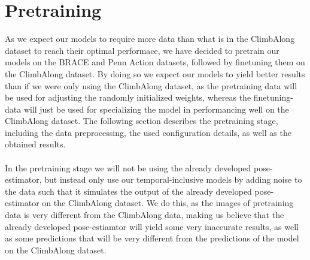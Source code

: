 \documentclass[./main.tex]{subfiles}
\begin{document}
\section{Pretraining}
\label{sec:pretraining}
As we expect our models to require more data than what is in the ClimbAlong dataset to reach their optimal performace, we have decided to pretrain our models on the BRACE and Penn Action datasets, followed by finetuning them on the ClimbAlong dataset. By doing so we expect our models to yield better results than if we were only using the ClimbAlong dataset, as the pretraining data will be used for adjusting the randomly initialized weights, whereas the finetuning-data will just be used for specializing the model in performancing well on the ClimbAlong dataset. The following section describes the pretraining stage, including the data preprocessing, the used configuration details, as well as the obtained results.
\\
\\
In the pretraining stage we will not be using the already developed pose-estimator, but instead only use our temporal-inclusive models by adding noise to the data such that it simulates the output of the already developed pose-estimator on the ClimbAlong dataset. We do this, as the images of pretraining data is very different from the ClimbAlong data, making us believe that the already developed pose-estiamtor will yield some very inaccurate results, as well as some predictions that will be very different from the predictions of the model on the ClimbAlong dataset.
\end{document}
